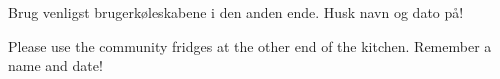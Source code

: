 \documentclass{article}
\begin{document}
\maketitle

\null
\vspace{-1cm}

\begin{center}
\huge


\vspace{-0.5cm}

Brug venligst brugerkøleskabene i den anden ende. Husk navn og dato på!

\english

\vspace{0.1cm}


\vspace{-0.7cm}

Please use the community fridges at the other end of the kitchen. Remember a name and date!

\end{center}

\dansk

\underskriv
\end{document}
